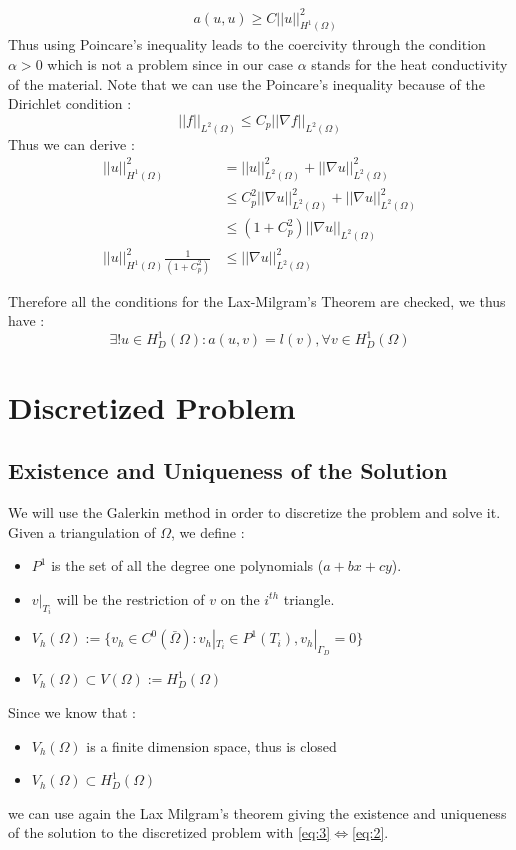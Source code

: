 \documentclass[a4paper]{report}
\begin{document}
\begin{itemize}
\begin{align*}
&a(u,u) \geq C ||u||^2_{H^1(\Omega)}
\end{align*}
Thus using Poincare's inequality leads to the coercivity through the condition $\alpha >0$
which is not a problem since in our case $\alpha$ stands for the heat conductivity of the material.
Note that we can use the Poincare's inequality  because of the Dirichlet condition :
\[
||f||_{L^2(\Omega)} \leq C_p ||\nabla f||_{L^2(\Omega)}
\]
Thus we can derive :
\begin{align*}
||u||_{H^1(\Omega)}^2&=||u||_{L^2(\Omega)}^2+||\nabla u ||_{L^2(\Omega)}^2\\
&\leq C_p^2||\nabla u ||^2_{L^2(\Omega)}+||\nabla u ||^2_{L^2(\Omega)}\\
&\leq (1+C_p^2)||\nabla u ||_{L^2(\Omega)}\\
||u||_{H^1(\Omega)}^2\frac{1}{(1+C_p^2)}&\leq ||\nabla u ||^2_{L^2(\Omega)}
\end{align*}
\end{itemize}
Therefore all the conditions for the Lax-Milgram's Theorem are checked, we thus have :
\[
\exists ! u \in H^1_D(\Omega) : a(u,v)=l(v), \forall v \in H^1_D(\Omega)
\]

\chapter{Discretized Problem}
\section{Existence and Uniqueness of the Solution}
We will use the Galerkin method in order to discretize the problem and solve it.
Given a triangulation of $\Omega$, we define :
\begin{itemize}
\item $P^1$ is the set of all the degree one polynomials ($a+bx+cy$).
\item $v|_{T_i}$ will be the restriction of $v$ on the $i^{th}$ triangle.
\item $
V_h(\Omega):=\{ v_h \in C^0(\bar{\Omega}) : v_h|_{T_i} \in P^1(T_i),v_h|_{\Gamma_D}=0\}
$
\item $V_h(\Omega) \subset V(\Omega):=H^1_D(\Omega)$
\end{itemize}

Since we know that :
\begin{itemize}
\item $V_h(\Omega)$ is a finite dimension space, thus is closed
\item $V_h(\Omega) \subset H^1_D(\Omega)$
\end{itemize}
we can use again the Lax Milgram's theorem giving the existence and uniqueness of the solution to the discretized problem with \ref{eq:3}$\iff$\ref{eq:2}.
\end{document}
